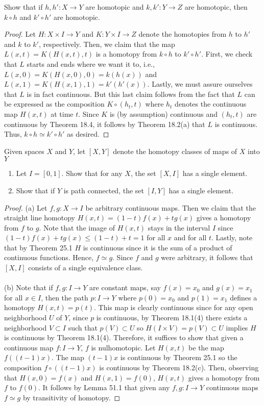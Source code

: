 \newpage
\begin{problem}[Munkres \S51, Ex.\,1]
Show that if $h,h'\colon X\to Y$ are homotopic and $k,k'\colon
Y\to Z$ are homotopic, then $k\circ h$ and $k'\circ h'$ are
homotopic.
\end{problem}
\begin{proof}
Let $H\colon X\times I\to Y$ and $K\colon Y\times I\to Z$ denote
the homotopies from $h$ to $h'$ and $k$ to $k'$,
respectively. Then, we claim that the map $L(x,t)=K(H(x,t),t)$ is
a homotopy from $k\circ h$ to $k'\circ h'$. First, we check that
$L$ starts and ends where we want it to, i.e.,
$L(x,0)=K(H(x,0),0)=k(h(x))$ and
$L(x,1)=K(H(x,1),1)=k'(h'(x))$. Lastly, we must assure ourselves
that $L$ is in fact continuous. But this last claim follows from
the fact that $L$ can be expressed as the composition $K\circ
(h_t,t)$ where $h_t$ denotes the continuous map $H(x,t)$ at time
$t$. Since $K$ is (by assumption) continuous and $(h_t,t)$ are
continuous by Theorem 18.4, it follows by Theorem 18.2(a) that
$L$ is continuous. Thus, $k\circ h\simeq k'\circ h'$ as desired.
\end{proof}
\newpage
\begin{problem}[Munkres \S51, Ex.\,2]
Given spaces $X$ and $Y$, let $[X,Y]$ denote the homotopy classes
of maps of $X$ into $Y$
\begin{enumerate}[label=(\alph*)]
\item Let $I=[0,1]$. Show that for any $X$, the set $[X,I]$ has a
  single element.
\item Show that if $Y$ is path connected, the set $[I,Y]$ has a
  single element.
\end{enumerate}
\end{problem}
\begin{proof}
(a) Let $f,g\colon X\to I$ be arbitrary continuous maps. Then we
claim that the straight line homotopy $H(x,t)=(1-t)f(x)+tg(x)$
gives a homotopy from $f$ to $g$. Note that the image of $H(x,t)$
stays in the interval $I$ since $(1-t)f(x)+tg(x)\leq (1-t)+t=1$
for all $x$ and for all $t$. Lastly, note that by Theorem 25.1
$H$ is continuous since it is the sum of a product of continuous
functions. Hence, $f\simeq g$. Since $f$ and $g$ were arbitrary,
it follows that $[X,I]$ consists of a single equivalence class.
\\\\
(b) Note that if $f,g\colon I\to Y$ are constant maps, say $f(x)=x_0$ and
$g(x)=x_1$ for all $x\in I$, then the path $p\colon I\to Y$ where
$p(0)=x_0$ and $p(1)=x_1$ defines a homotopy $H(x,t)=p(t)$. This map is
clearly continuous since for any open neighborhood $U$ of $Y$, since $p$ is
continuous, by Theorem 18.1(4) there exists a neighborhood $V\subset I$
such that $p(V)\subset U$ so $H(I\times V)=p(V)\subset U$ implies $H$ is
continuous by Theorem 18.1(4). Therefore, it suffices to show that given a
continuous map $f\colon I\to Y$, $f$ is nulhomotopic. Let $H(x,t)$ be the
map $f((t-1)x)$. The map $(t-1)x$ is continuous by Theorem 25.1 so the
composition $f\circ((t-1)x)$ is continuous by Theorem 18.2(c). Then,
observing that $H(x,0)=f(x)$ and $H(x,1)=f(0)$, $H(x,t)$ gives a homotopy
from $f$ to $f(0)$. It follows by Lemma 51.1 that given any $f,g\colon I\to
Y$ continuous maps $f\simeq g$ by transitivity of homotopy.
\end{proof}
